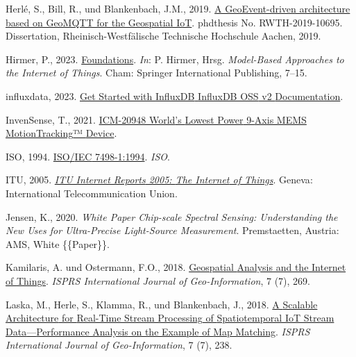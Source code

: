 \documentclass[
  11pt,
  a4paper,
  oneside, openany  ,captions=tableheading
]{scrbook}
\newlength{\cslhangindent}
\newenvironment{CSLReferences}[2] %
  {\begin{list}{}{%
   \setlength{\itemindent}{0pt}
   \setlength{\leftmargin}{0pt}
   \setlength{\parsep}{0pt}
   \ifodd #1
    \setlength{\leftmargin}{\cslhangindent}
    \setlength{\itemindent}{-1\cslhangindent}
   \fi
   \setlength{\itemsep}{#2\baselineskip}}}
  {\end{list}}
\theoremstyle{remark}
\begin{document}
\begin{CSLReferences}{1}{0}
Herlé, S., Bill, R., und Blankenbach, J.M., 2019.
\href{https://publications.rwth-aachen.de/record/772603/}{{A
GeoEvent-driven architecture based on GeoMQTT for the Geospatial IoT}}.
phdthesis No. RWTH-2019-10695. Dissertation, Rheinisch-Westf{ä}lische
Technische Hochschule Aachen, 2019.

Hirmer, P., 2023.
\href{https://doi.org/10.1007/978-3-031-18884-8_2}{Foundations}.
\emph{In}: P. Hirmer, Hrsg. \emph{Model-{Based Approaches} to the
{Internet} of {Things}}. {Cham}: {Springer International Publishing},
7--15.

influxdata, 2023.
\href{https://docs.influxdata.com/influxdb/v2/get-started/}{Get Started
with {InfluxDB} {\textbar} {InfluxDB OSS} v2 {Documentation}}.

InvenSense, T., 2021.
\href{https://invensense.tdk.com/wp-content/uploads/2021/10/DS-000189-ICM-20948-v1.5.pdf}{{ICM-20948
World}'s {Lowest Power} 9-{Axis MEMS MotionTracking}™ {Device}}.

ISO, 1994. \href{https://www.iso.org/standard/20269.html}{{ISO}/{IEC}
7498-1:1994}. \emph{ISO}.

ITU, 2005.
\emph{\href{https://www.itu.int:443/en/publications/gs/Pages/publications.aspx?parent=S-POL-IR.IT-2005/&media=paper}{{ITU
Internet Reports} 2005: {The Internet} of {Things}}}. {Geneva}:
{International Telecommunication Union}.

Jensen, K., 2020. \emph{White {Paper Chip-scale} Spectral Sensing:
Understanding the New Uses for Ultra-Precise Light-Source Measurement}.
{Premstaetten, Austria}: {AMS}, White \{\{Paper\}\}.

Kamilaris, A. und Ostermann, F.O., 2018.
\href{https://doi.org/10.3390/ijgi7070269}{Geospatial {Analysis} and the
{Internet} of {Things}}. \emph{ISPRS International Journal of
Geo-Information}, 7 (7), 269.

Laska, M., Herle, S., Klamma, R., und Blankenbach, J., 2018.
\href{https://doi.org/10.3390/ijgi7070238}{A {Scalable Architecture} for
{Real-Time Stream Processing} of {Spatiotemporal IoT Stream
Data}---{Performance Analysis} on the {Example} of {Map Matching}}.
\emph{ISPRS International Journal of Geo-Information}, 7 (7), 238.


\end{CSLReferences}
\end{document}
